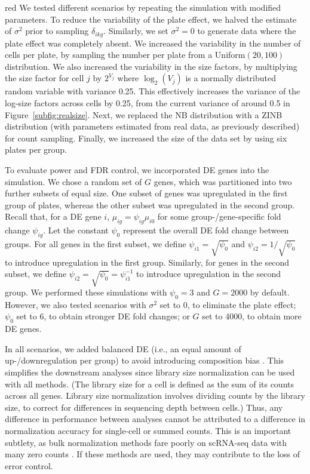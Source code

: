 \documentclass{article}
\begin{document}
\begin{color}{red}
We tested different scenarios by repeating the simulation with modified parameters.
To reduce the variability of the plate effect, we halved the estimate of $\sigma^2$ prior to sampling $\delta_{ikg}$.
Similarly, we set $\sigma^2=0$ to generate data where the plate effect was completely absent.
We increased the variability in the number of cells per plate, by sampling the number per plate from a Uniform$(20, 100)$ distribution.
We also increased the variability in the size factors, by multiplying the size factor for cell $j$ by $2^{V_j}$ where $\log_2(V_j)$ is a normally distributed random variable with variance 0.25.
This effectively increases the variance of the log-size factors across cells by 0.25, from the current variance of around 0.5 in Figure~\ref{subfig:realsize}.
Next, we replaced the NB distribution with a ZINB distribution (with parameters estimated from real data, as previously described) for count sampling.
Finally, we increased the size of the data set by using six plates per group.

To evaluate power and FDR control, we incorporated DE genes into the simulation.
We chose a random set of $G$ genes, which was partitioned into two further subsets of equal size.
One subset of genes was upregulated in the first group of plates, whereas the other subset was upregulated in the second group.
Recall that, for a DE gene $i$, $\mu_{ig} = \psi_{ig}\mu_{i0}$ for some group-/gene-specific fold change $\psi_{ig}$.
Let the constant $\psi_0$ represent the overall DE fold change between groups.
For all genes in the first subset, we define $\psi_{i1} = \sqrt{\psi_0}$ and $\psi_{i2} = 1/\sqrt{\psi_0}$ to introduce upregulation in the first group.
Similarly, for genes in the second subset, we define $\psi_{i2} = \sqrt{\psi_0} = \psi_{i1}^{-1}$ to introduce upregulation in the second group.
We performed these simulations with $\psi_0=3$ and $G=2000$ by default.
However, we also tested scenarios with $\sigma^2$ set to 0, to eliminate the plate effect; $\psi_0$ set to 6, to obtain stronger DE fold changes; or $G$ set to 4000, to obtain more DE genes.

In all scenarios, we added balanced DE (i.e., an equal amount of up-/downregulation per group) to avoid introducing composition bias \citep{robinson2010scaling}.
This simplifies the downstream analyses since library size normalization can be used with all methods.
(The library size for a cell is defined as the sum of its counts across all genes.
Library size normalization involves dividing counts by the library size, to correct for differences in sequencing depth between cells.)
Thus, any difference in performance between analyses cannot be attributed to a difference in normalization accuracy for single-cell or summed counts.
This is an important subtlety, as bulk normalization methods fare poorly on scRNA-seq data with many zero counts \citep{lun2016pooling}.
If these methods are used, they may contribute to the loss of error control.
\end{color}
\end{document}
